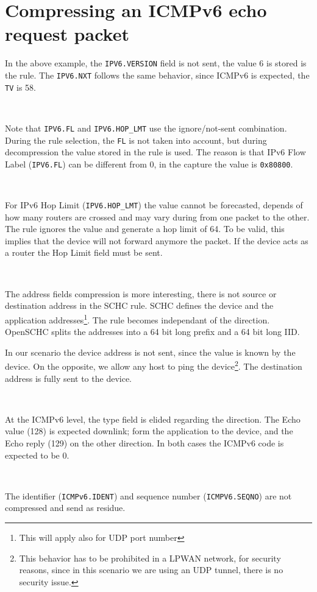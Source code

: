 \documentclass[onecolumn,12pt]{book}
\newcounter{c}
\begin{document}
\section{Compressing an ICMPv6 echo request packet}

In the above example, the \texttt{IPV6.VERSION} field is not sent, the value 6 is stored is the rule. 
The \texttt{IPV6.NXT} follows the same behavior, since ICMPv6 is expected, the \texttt{TV} is 58.

~

Note that \texttt{IPV6.FL} and \texttt{IPV6.HOP\_LMT} use the ignore/not-sent combination. During the rule selection, the \texttt{FL} is not taken into account, but during decompression the value stored in the rule is used. The reason is that IPv6 Flow Label (\texttt{IPV6.FL}) can be different from 0, in the capture the value is \texttt{0x80800}. 

~

For IPv6 Hop Limit  (\texttt{IPV6.HOP\_LMT}) the value cannot be forecasted, depends of how many routers are crossed and may vary during from one packet to the other. The rule ignores the value and generate a hop limit of 64. To be valid, this implies that the device will not forward anymore the packet. If the device acts as a router the Hop Limit field must be sent.

~

The address fields compression is more interesting, there is not source or destination address in the SCHC rule. SCHC defines the device  and the application addresses\footnote{This will apply also for UDP port number}. The rule becomes independant of the direction. OpenSCHC splits the addresses into a 64 bit long prefix and a 64 bit long IID. 

In our scenario the device address is not sent, since the value is known by the device. On the opposite, we allow any host to ping the device\footnote{This behavior has to be prohibited in a LPWAN network, for security reasons, since in this scenario we are using an UDP tunnel, there is no security issue.}. The destination address is fully sent to the device.

~~

At the ICMPv6 level, the type field is elided regarding the direction. The Echo value (128) is expected downlink; form the application to the device, and the Echo reply (129) on the other direction. In both cases the ICMPv6 code is expected to be 0.

~~~

The identifier (\texttt{ICMPv6.IDENT}) and sequence number (\texttt{ICMPV6.SEQNO}) are not compressed and send as residue.
\end{document}
